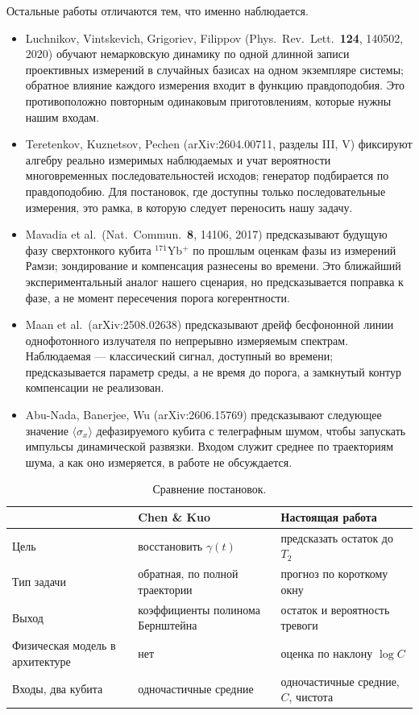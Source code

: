 \documentclass[12pt,a4paper]{report}
\numberwithin{equation}{chapter}
\begin{document}
Остальные работы отличаются тем, что именно наблюдается.
\begin{itemize}
\item Luchnikov, Vintskevich, Grigoriev, Filippov (Phys.\ Rev.\ Lett.\
      \textbf{124}, 140502, 2020) обучают немарковскую динамику по одной длинной
      записи проективных измерений в случайных базисах на одном экземпляре
      системы; обратное влияние каждого измерения входит в функцию
      правдоподобия. Это противоположно повторным одинаковым приготовлениям,
      которые нужны нашим входам.
\item Teretenkov, Kuznetsov, Pechen (arXiv:2604.00711, разделы III, V)
      фиксируют алгебру реально измеримых наблюдаемых и учат вероятности
      многовременных последовательностей исходов; генератор подбирается по
      правдоподобию. Для постановок, где доступны только последовательные
      измерения, это рамка, в которую следует переносить нашу задачу.
\item Mavadia et al.\ (Nat.\ Commun.\ \textbf{8}, 14106, 2017) предсказывают
      будущую фазу сверхтонкого кубита $^{171}$Yb$^+$ по прошлым оценкам фазы
      из измерений Рамзи; зондирование и компенсация разнесены во времени. Это
      ближайший экспериментальный аналог нашего сценария, но предсказывается
      поправка к фазе, а не момент пересечения порога когерентности.
\item Maan et al.\ (arXiv:2508.02638) предсказывают дрейф бесфононной линии
      однофотонного излучателя по непрерывно измеряемым спектрам.
      Наблюдаемая --- классический сигнал, доступный во времени;
      предсказывается параметр среды, а не время до порога, а замкнутый контур
      компенсации не реализован.
\item Abu-Nada, Banerjee, Wu (arXiv:2606.15769) предсказывают следующее
      значение $\langle\sigma_x\rangle$ дефазируемого кубита с
      телеграфным шумом, чтобы запускать импульсы динамической развязки.
      Входом служит среднее по траекториям шума, а как оно измеряется, в
      работе не обсуждается.
\end{itemize}

\begin{table}[h]
\centering
\caption{Сравнение постановок.}
\small
\begin{tabular}{@{}p{3.4cm}p{5cm}p{5cm}@{}}
\toprule
 & Chen \& Kuo & Настоящая работа \\
\midrule
Цель & восстановить $\gamma(t)$ & предсказать остаток до $T_2$ \\
Тип задачи & обратная, по полной траектории & прогноз по короткому окну \\
Выход & коэффициенты полинома Бернштейна & остаток и вероятность тревоги \\
Физическая модель в архитектуре & нет & оценка по наклону $\log C$ \\
Входы, два кубита & одночастичные средние & одночастичные средние, $C$, чистота \\
\bottomrule
\end{tabular}
\end{table}
\end{document}
